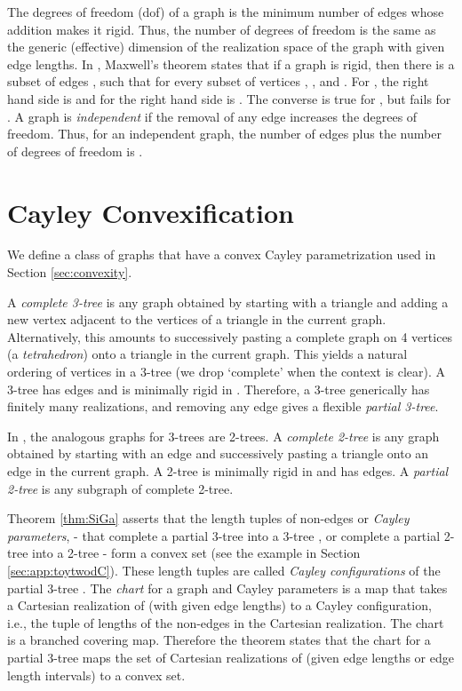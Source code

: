 \documentclass[]{article}
\begin{document}
The degrees of freedom (dof) of a graph is the minimum number of
edges whose addition makes it rigid. Thus, the number of degrees of freedom is
the same as the generic (effective) dimension of the realization space of the
graph with given edge lengths. In , Maxwell's theorem
\cite{maxwell} states that if a graph  is rigid, then there is a
subset of edges , such that for every subset of vertices ,
, and .
For , the right hand side is  and for  the right hand
side is .
The converse is true for , but fails for .
A graph is \emph{independent} if the removal of any edge increases the degrees 
of freedom. Thus, for an independent graph, the number of edges plus
the number of degrees of freedom is .

\section{Cayley Convexification}
\label{sec:app:convexity}

We define a class of graphs that have 
a convex Cayley parametrization used in Section \ref{sec:convexity}.

A \emph{complete 3-tree} is any graph obtained by starting with a triangle and
adding a new vertex adjacent to the vertices of a triangle in the current
graph. Alternatively, this amounts to successively pasting a complete graph on
4 vertices (a \emph{tetrahedron}) onto a triangle in the current graph. This
yields a natural ordering of vertices in a 3-tree (we drop `complete' when the
context is clear). A 3-tree has  edges and
is minimally rigid in . Therefore, a 3-tree generically has
finitely many realizations, and removing any edge gives a flexible
\emph{partial 3-tree}. 

In , the analogous graphs for 3-trees are 2-trees. A
\emph{complete 2-tree} is any graph obtained by starting with an edge and
successively pasting a triangle onto an edge in the current graph. 
A 2-tree is minimally rigid in  and has  edges.
A \emph{partial 2-tree} is any subgraph of complete 2-tree.

Theorem \ref{thm:SiGa} asserts that the length tuples of non-edges or \emph{Cayley parameters}, 
 - that complete a partial 3-tree  into a 3-tree , or complete a partial 2-tree into a 2-tree - form a convex set
(see the example in Section \ref{sec:app:toytwodC}).
These length tuples are called \emph{Cayley configurations} of the partial 3-tree . The \emph{chart} for a graph  and 
Cayley parameters  is a map that takes a Cartesian realization of  (with given edge lengths)
to a Cayley configuration, i.e., the tuple of lengths of the non-edges  in the Cartesian realization.
The chart is a branched covering map. Therefore the theorem states that the chart for a partial
3-tree maps the set of Cartesian realizations of  (given edge lengths or edge length intervals) to a convex set.
\end{document}
